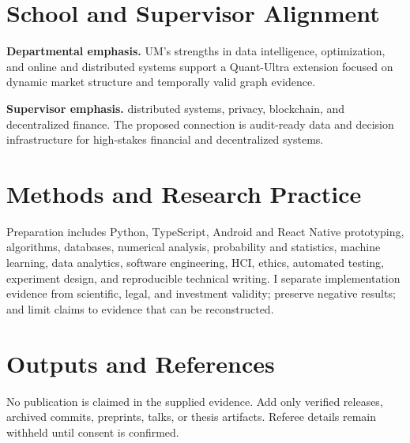 \documentclass[11pt]{article}
\begin{document}
\section*{School and Supervisor Alignment}
\textbf{Departmental emphasis.} UM's strengths in data intelligence, optimization, and online and distributed systems support a Quant-Ultra extension focused on dynamic market structure and temporally valid graph evidence.

\textbf{Supervisor emphasis.} distributed systems, privacy, blockchain, and decentralized finance. The proposed connection is audit-ready data and decision infrastructure for high-stakes financial and decentralized systems.

\section*{Methods and Research Practice}
Preparation includes Python, TypeScript, Android and React Native prototyping, algorithms, databases, numerical analysis, probability and statistics, machine learning, data analytics, software engineering, HCI, ethics, automated testing, experiment design, and reproducible technical writing. I separate implementation evidence from scientific, legal, and investment validity; preserve negative results; and limit claims to evidence that can be reconstructed.

\section*{Outputs and References}
No publication is claimed in the supplied evidence. Add only verified releases, archived commits, preprints, talks, or thesis artifacts. Referee details remain withheld until consent is confirmed.
\end{document}
